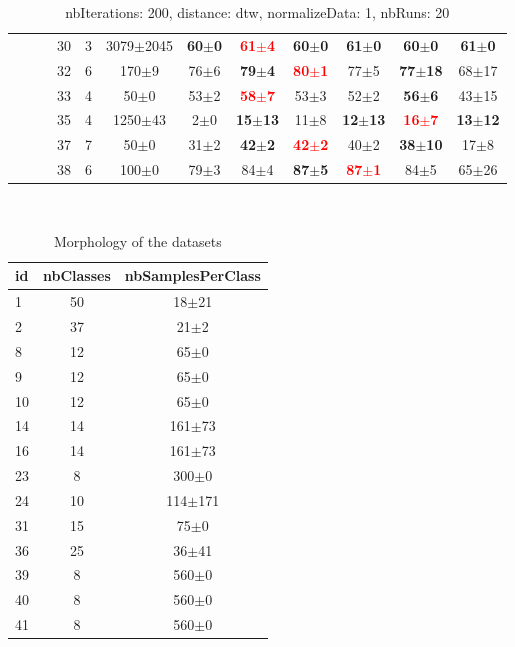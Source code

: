 \documentclass[12pt,a4paper,fleqn]{tufte-handout}
\begin{document}
\begin{table}
\begin{center}
\begin{tabular}{lllccccccccc}
&  &  & 30 & 3 & 3079$\pm$2045 & \textbf{60$\pm$0} & \textbf{\textcolor{red}{61$\pm$4}} & \textbf{60$\pm$0} & \textbf{61$\pm$0} & \textbf{60$\pm$0} & \textbf{61$\pm$0} \\   
&  &  & 32 & 6 &     170$\pm$9 &  76$\pm$6 & \textbf{ 79$\pm$4} & \textbf{\textcolor{red}{ 80$\pm$1}} &  77$\pm$5 & \textbf{77$\pm$18} & 68$\pm$17 \\   
&  &  & 33 & 4 &      50$\pm$0 &  53$\pm$2 & \textbf{\textcolor{red}{ 58$\pm$7}} &  53$\pm$3 &  52$\pm$2 & \textbf{ 56$\pm$6} & 43$\pm$15 \\   
&  &  & 35 & 4 &   1250$\pm$43 &   2$\pm$0 & \textbf{15$\pm$13} &  11$\pm$8 & \textbf{12$\pm$13} & \textbf{\textcolor{red}{ 16$\pm$7}} & \textbf{13$\pm$12} \\   
&  &  & 37 & 7 &      50$\pm$0 &  31$\pm$2 & \textbf{ 42$\pm$2} & \textbf{\textcolor{red}{ 42$\pm$2}} &  40$\pm$2 & \textbf{38$\pm$10} &  17$\pm$8 \\   
&  &  & 38 & 6 &     100$\pm$0 &  79$\pm$3 &  84$\pm$4 & \textbf{ 87$\pm$5} & \textbf{\textcolor{red}{ 87$\pm$1}} &  84$\pm$5 & 65$\pm$26 \\   
\end{tabular}   
\end{center}   
\caption{nbIterations: 200, distance: dtw, normalizeData: 1, nbRuns: 20}   
\label{nbit200DidtNoda1Nbru20}   
\end{table}   
 
 
\begin{table}  
\begin{center}  
\  
\setlength{\tabcolsep}{.16667em}  
\begin{tabular}{lcc}  
id & nbClasses & nbSamplesPerClass \\  
\hline  
1 & 50 &   18$\pm$21 \\  
2 & 37 &    21$\pm$2 \\  
8 & 12 &    65$\pm$0 \\  
9 & 12 &    65$\pm$0 \\  
10 & 12 &    65$\pm$0 \\  
14 & 14 &  161$\pm$73 \\  
16 & 14 &  161$\pm$73 \\  
23 &  8 &   300$\pm$0 \\  
24 & 10 & 114$\pm$171 \\  
31 & 15 &    75$\pm$0 \\  
36 & 25 &   36$\pm$41 \\  
39 &  8 &   560$\pm$0 \\  
40 &  8 &   560$\pm$0 \\  
41 &  8 &   560$\pm$0 \\  
\end{tabular}  
\end{center}  
\caption{Morphology of the datasets}  
\label{didtNoda1}  
\end{table}  
 
\end{document}
